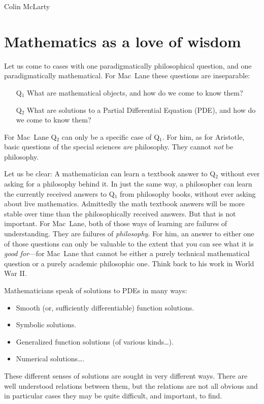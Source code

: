 \begin{artengenv}{Colin McLarty}
\section{Mathematics as a love of wisdom}

Let us come to cases with one paradigmatically philosophical question, and one paradigmatically mathematical.  For Mac~Lane these questions are inseparable:%
\begin{itemize}
         \item[Q$_1$] What are mathematical objects, and how do we come to know them? %
         \item[Q$_2$] What are solutions to a Partial Differential Equation (PDE), and how do we come to know them?
       \end{itemize}
For Mac~Lane Q$_2$ can only be a specific case of Q$_1$.  For him, as for Aristotle, basic questions of the special sciences \textit{are} philosophy.  They cannot \textit{not} be philosophy.

Let us be clear:  A mathematician can learn a textbook answer to Q$_2$ without ever asking for a philosophy behind it.  In just the same way, a philosopher can learn the currently received answers to Q$_1$ from philosophy books, without ever asking about live mathematics.  Admittedly the math textbook answers will be more stable over time than the philosophically received answers. But that is not important.  For Mac~Lane, both of those ways of learning are failures of understanding.  They are failures of \textit{philosophy}.  For him, an answer to either one of those questions can only be valuable to the extent that you can see what it is \textit{good for}---for Mac~Lane that cannot be either a purely technical mathematical question or a purely academic philosophic one.  Think back to his work in World War II.

Mathematicians speak of solutions to PDEs in many ways:
\begin{itemize}
  \item Smooth (or, sufficiently differentiable) function solutions.
  \item Symbolic solutions.
  \item Generalized function solutions (of various kinds\dots).
  \item Numerical solutions\dots.
\end{itemize}
These different senses of solutions are sought in very different ways.  There are well understood relations between them, but the relations are not all obvious and in particular cases they may be quite difficult, and important, to find.


\end{artengenv}
